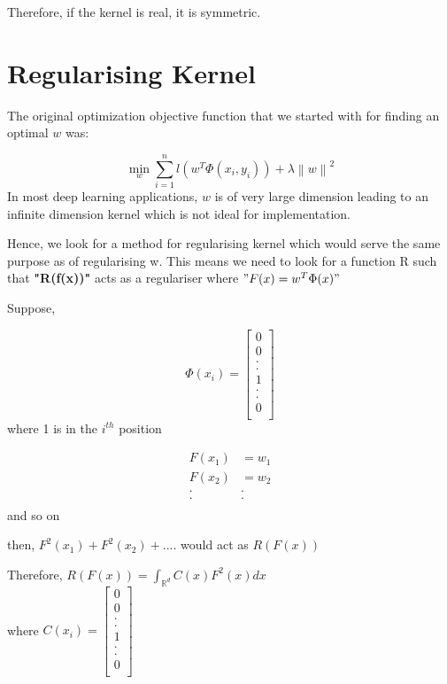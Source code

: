 \documentclass[11pt, twosides]{article}
\begin{document}
Therefore, if the kernel is real, it is symmetric.

\section{Regularising Kernel}
The original optimization objective function that we started with for finding an optimal $w$ was:

  \[ \min_{w} \sum_{i=1}^{n} l(w^T\Phi(x_i, y_i) ) + \lambda \left \| w \right \| ^2 \]
In most deep learning applications, $w$ is of very large dimension leading to an infinite dimension kernel which is not ideal for implementation. 

Hence, we look for a method for regularising kernel which would serve the same purpose as of regularising w. This means we need to look for a function R such that \textbf{"R(f(x))"} acts as a regulariser where $"F(x) = w^T\Phi(x)"$

Suppose,

\begin{equation}
    \Phi(x_i) = \begin{bmatrix}
0\\ 
0\\ 
.\\ 
.\\ 
1\\ 
.\\ 
.\\
0\\ 

\end{bmatrix}
\end{equation}
where 1 is in the $i^{th}$ position 

\begin{equation}
\begin{split}
    F(x_1) & = w_1 \\
    F(x_2) & = w_2 \\
    . & . \\
    . & . \\
    \end{split}            
\end{equation}
and so on

then, $F^2(x_1) + F^2(x_2) + ....$ would act as $R(F(x))$

Therefore, $R(F(x)) = \int_{\mathbb{R}^d}^{} C(x) F^2(x) dx$ \\
where $C(x_i) = \begin{bmatrix}
0\\ 
0\\ 
.\\ 
.\\ 
1\\ 
.\\ 
.\\
0\\ 

\end{bmatrix}$
\end{document}
